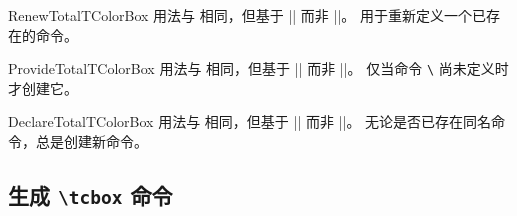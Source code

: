 \begin{docCommand}{RenewTotalTColorBox}{}
  用法与  相同，但基于 |\RenewDocumentCommand| 而非 |\NewDocumentCommand|。
  用于重新定义一个已存在的命令。
\end{docCommand}

\begin{docCommand}{ProvideTotalTColorBox}{}
  用法与  相同，但基于 |\ProvideDocumentCommand| 而非 |\NewDocumentCommand|。
  仅当命令 \texttt{\textbackslash} 尚未定义时才创建它。
\end{docCommand}

\begin{docCommand}{DeclareTotalTColorBox}{}
  用法与  相同，但基于 |\DeclareDocumentCommand| 而非 |\NewDocumentCommand|。
  无论是否已存在同名命令，总是创建新命令。
\end{docCommand}


\clearpage
\subsection{生成 \texttt{\textbackslash tcbox} 命令}\label{subsec:macros_tcbox}
\enlargethispage*{10mm}

